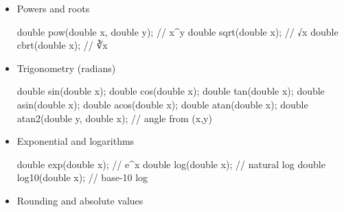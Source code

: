 \documentclass[
  letterpaper,
  DIV=11,
  numbers=noendperiod]{scrreprt}
\newenvironment{Shaded}{\begin{snugshade}}{\end{snugshade}}
\newcommand{\CommentTok}[1]{\textcolor[rgb]{0.37,0.37,0.37}{#1}}
\newcommand{\DataTypeTok}[1]{\textcolor[rgb]{0.68,0.00,0.00}{#1}}
\newcommand{\NormalTok}[1]{\textcolor[rgb]{0.00,0.23,0.31}{#1}}
\newcommand{\OperatorTok}[1]{\textcolor[rgb]{0.37,0.37,0.37}{#1}}
\begin{document}
\begin{itemize}
\item
  Powers and roots

\begin{Shaded}
\begin{Highlighting}[]
\DataTypeTok{double}\NormalTok{ pow}\OperatorTok{(}\DataTypeTok{double}\NormalTok{ x}\OperatorTok{,} \DataTypeTok{double}\NormalTok{ y}\OperatorTok{);}   \CommentTok{// x\^{}y}
\DataTypeTok{double}\NormalTok{ sqrt}\OperatorTok{(}\DataTypeTok{double}\NormalTok{ x}\OperatorTok{);}            \CommentTok{// √x}
\DataTypeTok{double}\NormalTok{ cbrt}\OperatorTok{(}\DataTypeTok{double}\NormalTok{ x}\OperatorTok{);}            \CommentTok{// ∛x}
\end{Highlighting}
\end{Shaded}
\item
  Trigonometry (radians)

\begin{Shaded}
\begin{Highlighting}[]
\DataTypeTok{double}\NormalTok{ sin}\OperatorTok{(}\DataTypeTok{double}\NormalTok{ x}\OperatorTok{);}
\DataTypeTok{double}\NormalTok{ cos}\OperatorTok{(}\DataTypeTok{double}\NormalTok{ x}\OperatorTok{);}
\DataTypeTok{double}\NormalTok{ tan}\OperatorTok{(}\DataTypeTok{double}\NormalTok{ x}\OperatorTok{);}
\DataTypeTok{double}\NormalTok{ asin}\OperatorTok{(}\DataTypeTok{double}\NormalTok{ x}\OperatorTok{);}
\DataTypeTok{double}\NormalTok{ acos}\OperatorTok{(}\DataTypeTok{double}\NormalTok{ x}\OperatorTok{);}
\DataTypeTok{double}\NormalTok{ atan}\OperatorTok{(}\DataTypeTok{double}\NormalTok{ x}\OperatorTok{);}
\DataTypeTok{double}\NormalTok{ atan2}\OperatorTok{(}\DataTypeTok{double}\NormalTok{ y}\OperatorTok{,} \DataTypeTok{double}\NormalTok{ x}\OperatorTok{);} \CommentTok{// angle from (x,y)}
\end{Highlighting}
\end{Shaded}
\item
  Exponential and logarithms

\begin{Shaded}
\begin{Highlighting}[]
\DataTypeTok{double}\NormalTok{ exp}\OperatorTok{(}\DataTypeTok{double}\NormalTok{ x}\OperatorTok{);}     \CommentTok{// e\^{}x}
\DataTypeTok{double}\NormalTok{ log}\OperatorTok{(}\DataTypeTok{double}\NormalTok{ x}\OperatorTok{);}     \CommentTok{// natural log}
\DataTypeTok{double}\NormalTok{ log10}\OperatorTok{(}\DataTypeTok{double}\NormalTok{ x}\OperatorTok{);}   \CommentTok{// base{-}10 log}
\end{Highlighting}
\end{Shaded}
\item
  Rounding and absolute values


\end{itemize}
\end{document}
